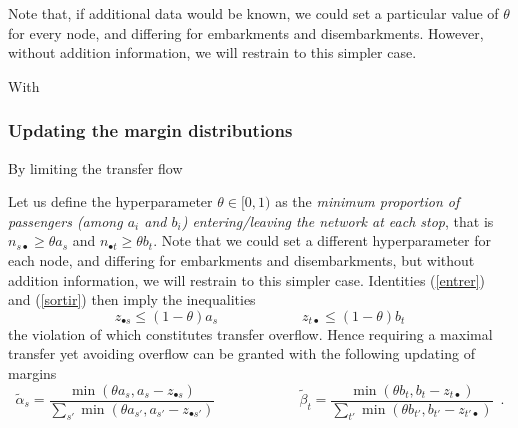 \documentclass{bmcart}
\begin{document}
Note that, if additional data would be known, we could set a particular value of $\theta$ for every node, and differing for embarkments and disembarkments. However, without addition information, we will restrain to this simpler case. 

With 

\subsubsection{Updating the margin distributions}
\label{marginup}

By limiting the transfer flow 

Let us define the hyperparameter $ \theta\in [0, 1)$ as the \emph{minimum proportion of passengers (among $a_i$ and $b_i$) entering/leaving the network at each stop}, that is $n_{s\bullet}\ge \theta a_s$ and $n_{\bullet t}\ge \theta b_t$. Note that we could set a different hyperparameter for each node, and differing for embarkments and disembarkments, but without addition information, we will restrain to this simpler case. Identities (\ref{entrer}) and  (\ref{sortir}) then imply the inequalities
\begin{displaymath}
z_{\bullet s} \le (1 - \theta) a_s\qquad\qquad \qquad z_{t \bullet} \le  (1 - \theta) b_t
\end{displaymath}
the violation of which constitutes transfer overflow. Hence requiring a maximal transfer yet avoiding overflow can be granted with the following updating of margins
\begin{equation}
\label{alpha_beta_update}
\widetilde{\alpha}_s = \frac{\min(\theta a_s, a_s - z_{\bullet s})}{\sum_{s'} \min(\theta a_{s'}, a_{s'} - z_{\bullet {s'}})}   \qquad \qquad \qquad
	\widetilde{\beta}_t = \frac{\min(\theta b_t, b_t - z_{t \bullet})}{\sum_{t'} \min(\theta b_{t'}, b_{t'} - z_{{t'} \bullet})}  \enspace. 
\end{equation}
 
\end{document}
